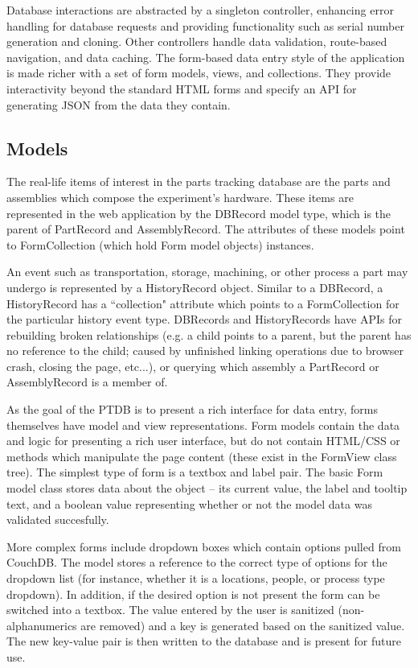 \documentclass[journal]{IEEEtran}
\begin{document}
Database interactions are abstracted by a singleton controller, enhancing error handling for database requests
and providing functionality such as serial number generation and cloning. Other controllers handle data validation,
route-based navigation, and data caching. The form-based data entry style of the application is made richer with a
set of form models, views, and collections. They provide interactivity beyond the standard HTML forms and
specify an API for generating JSON from the data they contain.

\subsection{Models}
The real-life items of interest in the parts tracking database are the parts and assemblies which compose
the experiment's hardware. These items are represented in the web application by the DBRecord model type, which is
the parent of PartRecord and AssemblyRecord. The attributes of these models point to FormCollection (which hold
Form model objects) instances.

An event such as transportation, storage, machining, or other process a part may undergo is represented by a 
HistoryRecord object. Similar to a DBRecord, a HistoryRecord has a ``collection" attribute which points to a
FormCollection for the particular history event type. DBRecords and HistoryRecords have APIs for rebuilding
broken relationships (e.g. a child points to a parent, but the parent has no reference to the child; caused by 
unfinished linking operations due to browser crash, closing the page, etc...), or querying
which assembly a PartRecord or AssemblyRecord is a member of.

As the goal of the PTDB is to present a rich interface for data entry, forms
themselves have model and view representations. 
Form models contain the data and logic for presenting a rich user interface, but do not contain HTML/CSS or
methods which manipulate the page content (these exist in the FormView class tree).
The simplest type of form is a textbox and label pair. The basic Form model class stores data 
about the object -- its current value, the label and tooltip text,
and a boolean value representing whether or not the model data was validated succesfully.

More complex forms include dropdown boxes which contain options pulled from CouchDB. The model
stores a reference to the correct type of options for the dropdown list (for instance, whether it is a locations, people,
or process type dropdown). In addition, if the 
desired option is not present the form can be switched into a textbox. The value entered by
the user is sanitized (non-alphanumerics are removed) and a key is generated based on the sanitized value. The new key-value
pair is then written to the database and is present for future use.
\end{document}
